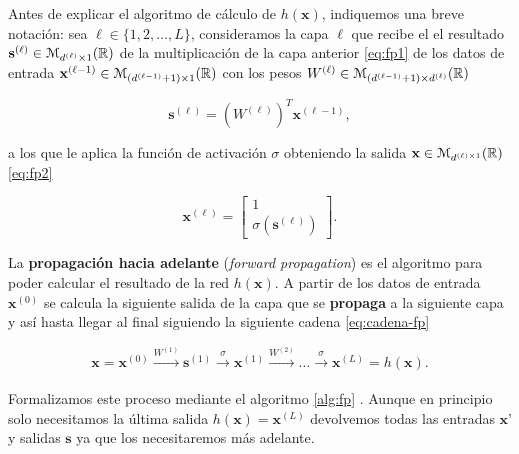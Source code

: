 Antes de explicar el algoritmo de cálculo de $h(\textbf{x})$, indiquemos una breve notación: sea $\ell \in \{1, 2, \ldots, L\}$, consideramos la capa $\ell$ que recibe el el resultado $\textbf{s}^{(\ell)} \in \mathcal{M}_{d^{(\ell)} \times 1}(\mathbb{R})$ de la multiplicación de la capa anterior \eqref{eq:fp1} de los datos de entrada $\textbf{x}^{(\ell-1)} \in \mathcal{M}_{(d^{(\ell-1)} + 1) \times 1}(\mathbb{R})$ con los pesos $W^{(\ell)} \in \mathcal{M}_{(d^{(\ell-1)} + 1) \times d^{(\ell)}}(\mathbb{R})$

\begin{equation}
  \textbf{s}^{(\ell)} = (W^{(\ell)})^T \textbf{x}^{(\ell-1)},
  \label{eq:fp1}
\end{equation}

a los que le aplica la función de activación $\sigma$ obteniendo la salida $\textbf{x} \in \mathcal{M}_{d^{(\ell) \times 1}}(\mathbb{R})$ \eqref{eq:fp2}

\begin{equation}
  \textbf{x}^{(\ell)} = \begin{bmatrix} 1 \\ \sigma(\textbf{s}^{(\ell)})\end{bmatrix}.
  \label{eq:fp2}
\end{equation}

La \textbf{propagación hacia adelante} (\emph{forward propagation}) es el algoritmo para poder calcular el resultado de la red $h(\textbf{x})$. A partir de los datos de entrada $\textbf{x}^{(0)}$ se calcula la siguiente salida de la capa que se \textbf{propaga} a la siguiente capa y así hasta llegar al final siguiendo la siguiente cadena \eqref{eq:cadena-fp}

\begin{equation}
  \textbf{x} = \textbf{x}^{(0)} \xrightarrow[]{W^{(1)}} \textbf{s}^{(1)} \xrightarrow[]{\sigma} \textbf{x}^{(1)} \xrightarrow{W^{(2)}} \ldots \xrightarrow{\sigma} \textbf{x}^{(L)} = h(\textbf{x}).
  \label{eq:cadena-fp}
\end{equation}

Formalizamos este proceso mediante el algoritmo \autoref{alg:fp} \cite{abu2012learning}. Aunque en principio solo necesitamos la última salida $h(\textbf{x}) = \textbf{x}^{(L)}$ devolvemos todas las entradas $\textbf{x'}$ y salidas $\textbf{s}$ ya que los necesitaremos más adelante.

